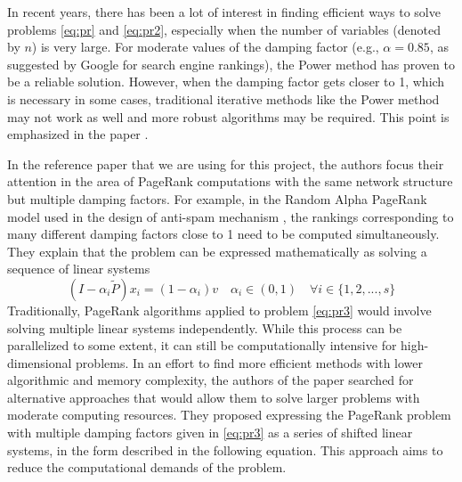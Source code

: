 \noindent In recent years, there has been a lot of interest in finding efficient ways to solve problems \ref{eq:pr} and \ref{eq:pr2}, especially when the number of variables (denoted by $n$) is very large. For moderate values of the damping factor (e.g., $\alpha = 0.85$, as suggested by Google for search engine rankings), the Power method has proven to be a reliable solution. However, when the damping factor gets closer to 1, which is necessary in some cases, traditional iterative methods like the Power method may not work as well and more robust algorithms may be required. This point is emphasized in the paper \cite{SHEN2022126799}. \vspace*{0.4cm}

\noindent In the reference paper that we are using for this project, the authors focus their attention in the area of PageRank computations with the same network structure but multiple damping factors. For example, in the Random Alpha PageRank model used in the design of anti-spam mechanism \cite{Constantine2009Random}, the rankings corresponding to many different damping factors close to 1 need to be computed simultaneously. They explain that the problem can be expressed mathematically as solving a sequence of linear systems
\begin{equation}\label{eq:pr3}
    (I - \alpha_i \tilde P)x_i = (1 - \alpha_i)v \quad  \alpha_i \in (0, 1) \quad \forall i \in \{1, 2, ..., s\}
\end{equation}
Traditionally, PageRank algorithms applied to problem \ref{eq:pr3} would involve solving multiple linear systems independently. While this process can be parallelized to some extent, it can still be computationally intensive for high-dimensional problems. In an effort to find more efficient methods with lower algorithmic and memory complexity, the authors of the paper searched for alternative approaches that would allow them to solve larger problems with moderate computing resources. They proposed expressing the PageRank problem with multiple damping factors given in \ref{eq:pr3} as a series of shifted linear systems, in the form described in the following equation. This approach aims to reduce the computational demands of the problem.
